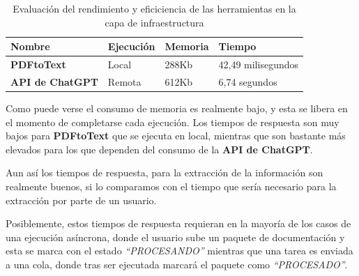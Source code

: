 \begin{table}[h]
    \renewcommand{\arraystretch}{1.5}
    \setlength{\tabcolsep}{10pt}
    \centering
    \begin{tabular}{>{\bfseries}p{} p{} p{} p{} }
        \toprule
        \textbf{Nombre}         & \textbf{Ejecución} & \textbf{Memoria} & \textbf{Tiempo}    \\
        \midrule
        \textbf{PDFtoText}      & Local              & 288Kb            & 42,49 milisegundos \\
        \textbf{API de ChatGPT} & Remota             & 612Kb            & 6,74 segundos      \\
        \bottomrule
    \end{tabular}
    \caption{Evaluación del rendimiento y eficiciencia de las herramientas en la capa de infraestructura}
    \label{tab:execution_performance}
\end{table}

Como puede verse el consumo de memoria es realmente bajo, y esta se libera en el momento de completarse cada ejecución.
Los tiempos de respuesta son muy bajos para \textbf{PDFtoText} que se ejecuta en local, mientras que son bastante más
elevados para los que dependen del consumo de la \textbf{API de ChatGPT}.

Aun así los tiempos de respuesta, para la extracción de la información son realmente buenos, si lo comparamos con el
tiempo que sería necesario para la extracción por parte de un usuario.

Posiblemente, estos tiempos de respuesta requieran en la mayoría de los casos de una ejecución asíncrona, donde el
usuario sube un paquete de documentación y esta se marca con el estado \textit{``PROCESANDO''} mientras que una tarea es
enviada a una cola, donde tras ser ejecutada marcará el paquete como \textit{``PROCESADO''}.